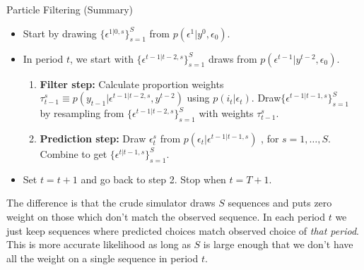 \begin{frame}{Particle Filtering (Summary)}
\begin{itemize}
\item Start by drawing $\{ \epsilon^{1|0,s}\}_{s=1}^S$ from $p(\epsilon^1 | y^0, \epsilon_0)$.
\item In period $t$, we start with $\{ \epsilon^{t-1|t-2,s}\}_{s=1}^S$ draws from $p(\epsilon^{t-1} | y^{t-2},\epsilon_0)$.
\begin{enumerate}
\item \textbf{Filter step:} Calculate proportion weights $\tau_{t-1}^s \equiv p(y_{t-1} | \epsilon^{t-1 | t-2,s}, y^{t-2}) $ using $p(i_t | \epsilon_t)$. Draw$\{\epsilon^{t-1 | t-1,s}\}_{s=1}^S$ by resampling from $\{ \epsilon^{t-1|t-2,s}\}_{s=1}^S$ with weights $\tau_{t-1}^s$.
\item \textbf{Prediction step:} Draw $\epsilon_t^s$ from $p(\epsilon_t | \epsilon^{t-1 | t-1,s})$ , for $s=1,\ldots,S$. Combine to get 
$\{ \epsilon^{t | t-1,s} \}_{s=1}^S$.
\end{enumerate}
\item Set $t=t+1$ and go back to step 2.  Stop when $t=T+1$.
\end{itemize}
The difference is that the crude simulator draws $S$ sequences and puts zero weight on those which don't match the observed sequence. In each period $t$ we just keep sequences where predicted choices match observed choice of \textit{that period}. This is more accurate likelihood as long as $S$ is large enough that we don't have all the weight on a single sequence in period $t$.
\end{frame}



